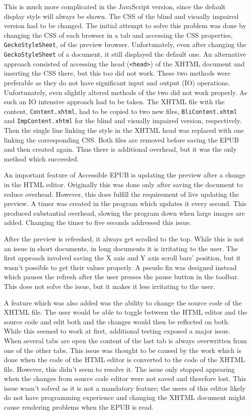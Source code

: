 This is much more complicated in the JavaScript version, since the default display style will always be shown. The CSS of the blind and visually impaired version had to be changed. The initial attempt to solve this problem was done by changing the CSS of each browser in a tab and accessing the CSS properties, \lstinline|GeckoStyleSheet|, of the preview browser. Unfortunately, even after changing the \lstinline|GeckoStyleSheet| of a document, it still displayed the default one. An alternative approach consisted of accessing the head (\lstinline|<head>|) of the XHTML document and inserting the CSS there, but this too did not work. These two methods were preferable as they do not have significant input and output (IO) operations. Unfortunately, even slightly altered methods of the two did not work properly. As such an IO intensive approach had to be taken. The XHTML file with the content, \lstinline|Content.xhtml|, had to be copied to two new files, \lstinline|BliContent.xhtml| and \lstinline|ImpContent.xhtml| for the blind and visually impaired version, respectively. Then the single line linking the style in the XHTML head was replaced with one linking the corresponding CSS. 
Both files are removed before saving the EPUB and then created again. Thus there is additional overhead, but it was the only method which succeeded.

An important feature of Accessible EPUB is updating the preview after a change in the HTML editor. Originally this was done only after saving the document to reduce overhead. However, this does fulfill the requirement of live updating the preview. A timer was created in the program which updates it every second. This produced substantial overhead, slowing the program down when large images are added. Changing the timer to five seconds addressed this issue. 

After the preview is refreshed, it always get scrolled to the top. While this is not an issue in short documents, in long documents it is irritating to the user. The first approach involved saving the X axis and Y axis scroll bars' position, but it wasn't possible to get their values properly. A pseudo fix was designed instead which pauses the refresh after the user presses the pause button in the toolbar. This does not solve the issue, but it makes it less irritating to the user.

A feature which was also added was the ability to change the source code of the XHTML file. The user would be able to toggle between the HTML editor and the source code and edit both and the changes would then be reflected on both. While this seemed to work at first, additional testing exposed a major issue. When several tabs are open the content of the last tab is always overwritten from one of the other tabs. This issue was thought to be caused by the work which is done when the code of the HTML editor is converted to the code of the XHTML file. However, this didn't seem to resolve it. The issue only stopped appearing when the changes from source code editor were not saved and therefore lost. This issue wasn't solved as it is not a mandatory feature; the users of this editor likely do not have programming experience and changing the XHTML document might cause rendering problems when the EPUB is read. 

